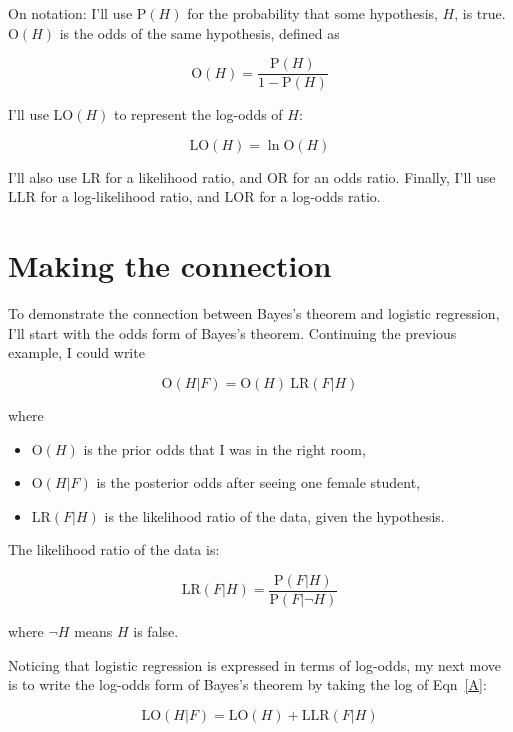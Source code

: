 \documentclass[12pt]{article}
\renewcommand{\P}{\mathrm{P}}
\renewcommand{\O}{\mathrm{O}}
\newcommand{\LR}{\mathrm{LR}}
\newcommand{\LO}{\mathrm{LO}}
\newcommand{\LLR}{\mathrm{LLR}}
\newcommand{\OR}{\mathrm{OR}}
\newcommand{\LOR}{\mathrm{LOR}}
\newcommand{\notH}{\neg H}
\begin{document}
On notation: I'll use $\P(H)$ for the probability
that some hypothesis, $H$, is true.  $\O(H)$ is the odds of the same
hypothesis, defined as

\[ \O(H) = \frac{\P(H)}{1 - \P(H)} \]

I'll use $\LO(H)$ to represent the log-odds of $H$:

\[ \LO(H) = \ln \O(H) \]

I'll also use $\LR$ for a likelihood ratio, and $\OR$ for an odds
ratio.  Finally, I'll use $\LLR$ for a log-likelihood ratio, and
$\LOR$ for a log-odds ratio.





\section{Making the connection}

To demonstrate the connection between Bayes's theorem and
logistic regression, I'll start with the odds form
of Bayes's theorem.  Continuing the previous example,
I could write

\begin{equation} \label{A}
\O(H|F) = \O(H)~\LR(F|H)
\end{equation}

where

\begin{itemize}

\item $\O(H)$ is the prior odds that I was in the right room,

\item $\O(H|F)$ is the posterior odds after seeing one female student,

\item $\LR(F|H)$ is the likelihood ratio of the data, given
the hypothesis.

\end{itemize}

The likelihood ratio of the data is:

\[ \LR(F|H) = \frac{\P(F|H)}{\P(F|\notH)} \]

where $\notH$ means $H$ is false.

Noticing that logistic regression is expressed in terms of
log-odds, my next move is to write the log-odds form of
Bayes's theorem by taking the log of Eqn~\ref{A}:

\begin{equation} \label{B}
\LO(H|F) = \LO(H) + \LLR(F|H)
\end{equation}
\end{document}
